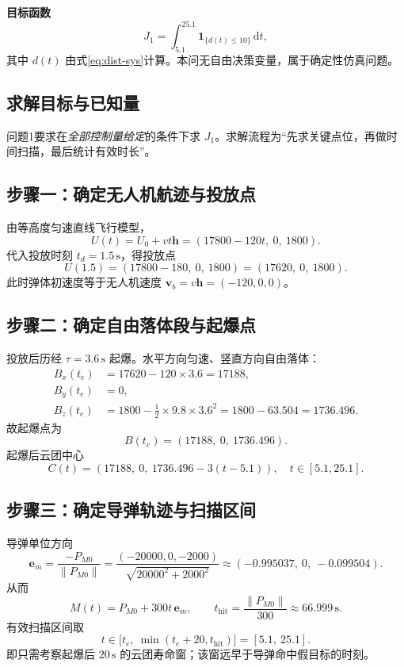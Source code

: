 \documentclass[withoutpreface,bwprint]{cumcmthesis}
\begin{document}
\textbf{目标函数}
\begin{equation}
J_1=\int_{5.1}^{25.1}\mathbf{1}_{\{d(t)\le 10\}}\,\mathrm{d}t,
\label{eq:q1-obj}
\end{equation}
其中 $d(t)$ 由式\eqref{eq:dist-sys}计算。本问无自由决策变量，属于确定性仿真问题。

\subsection{求解目标与已知量}
问题1要求在\emph{全部控制量给定}的条件下求 $J_1$。求解流程为“先求关键点位，再做时间扫描，最后统计有效时长”。

\subsection{步骤一：确定无人机航迹与投放点}
由等高度匀速直线飞行模型，
\begin{equation}
U(t)=U_0+vt\mathbf{h}=(17800-120t,\ 0,\ 1800).
\end{equation}
代入投放时刻 $t_d=1.5\,\mathrm{s}$，得投放点
\begin{equation}
U(1.5)=(17800-180,\ 0,\ 1800)=(17620,\ 0,\ 1800).
\label{eq:q1-drop}
\end{equation}
此时弹体初速度等于无人机速度 $\mathbf{v}_b=v\mathbf{h}=(-120,0,0)$。

\subsection{步骤二：确定自由落体段与起爆点}
投放后历经 $\tau=3.6\,\mathrm{s}$ 起爆。水平方向匀速、竖直方向自由落体：
\begin{align}
B_x(t_e)&=17620-120\times 3.6=17188,\\
B_y(t_e)&=0,\\
B_z(t_e)&=1800-\frac12\times 9.8\times 3.6^2
=1800-63.504=1736.496.
\end{align}
故起爆点为
\begin{equation}
B(t_e)=(17188,\ 0,\ 1736.496).
\label{eq:q1-det}
\end{equation}
起爆后云团中心
\begin{equation}
C(t)=(17188,\ 0,\ 1736.496-3(t-5.1)),
\quad t\in[5.1,25.1].
\end{equation}

\subsection{步骤三：确定导弹轨迹与扫描区间}
导弹单位方向
\[
\mathbf{e}_m=\frac{-P_{M0}}{\|P_{M0}\|}
=\frac{(-20000,0,-2000)}{\sqrt{20000^2+2000^2}}
\approx (-0.995037,\ 0,\ -0.099504).
\]
从而
\begin{equation}
M(t)=P_{M0}+300t\,\mathbf{e}_m,
\qquad
t_{\mathrm{hit}}=\frac{\|P_{M0}\|}{300}\approx 66.999\,\mathrm{s}.
\end{equation}
有效扫描区间取
\[
t\in\big[t_e,\ \min(t_e+20,t_{\mathrm{hit}})\big]
=[5.1,\ 25.1].
\]
即只需考察起爆后 $20\,\mathrm{s}$ 的云团寿命窗；该窗远早于导弹命中假目标的时刻。
\end{document}
